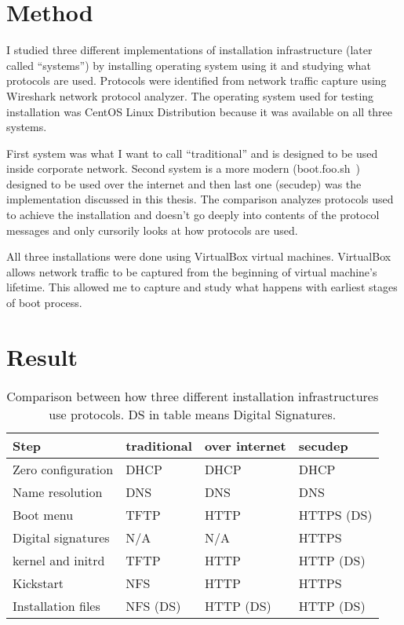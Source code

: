 
\section{Method}

I studied three different implementations of installation
infrastructure (later called ``systems'') by installing operating
system using it and studying what protocols are used. Protocols were
identified from network traffic capture using Wireshark network
protocol analyzer. The operating system used for testing installation
was CentOS Linux Distribution because it was available on all three
systems.

First system was what I want to call ``traditional'' and is designed
to be used inside corporate network. Second system is a more modern
(boot.foo.sh~\cite{boot-foo-sh}) designed to be used over the internet
and then last one (secudep) was the implementation discussed in this
thesis. The comparison analyzes protocols used to achieve the
installation and doesn't go deeply into contents of the protocol
messages and only cursorily looks at how protocols are used.

All three installations were done using VirtualBox virtual
machines. VirtualBox allows network traffic to be captured from the
beginning of virtual machine's lifetime. This allowed me to capture
and study what happens with earliest stages of boot process.

\section{Result}

\begin{table}[!ht]
  \def\arraystretch{1.1}%
  \begin{center}
    \begin{tabular}{| l | l | l | l |}
      \hline
      Step               & traditional & over internet & secudep    \\
      \hline
      Zero configuration & DHCP        & DHCP          & DHCP       \\
      Name resolution    & DNS         & DNS           & DNS        \\
      Boot menu          & TFTP        & HTTP          & HTTPS (DS) \\
      Digital signatures & N/A         & N/A           & HTTPS      \\
      kernel and initrd  & TFTP        & HTTP          & HTTP (DS)  \\
      Kickstart          & NFS         & HTTP          & HTTPS      \\
      Installation files & NFS (DS)    & HTTP (DS)     & HTTP (DS)  \\
      \hline
    \end{tabular}
    \caption{Comparison between how three different installation
      infrastructures use protocols. DS in table means Digital
      Signatures.\label{tab:comparison_table}}
  \end{center}
\end{table}

